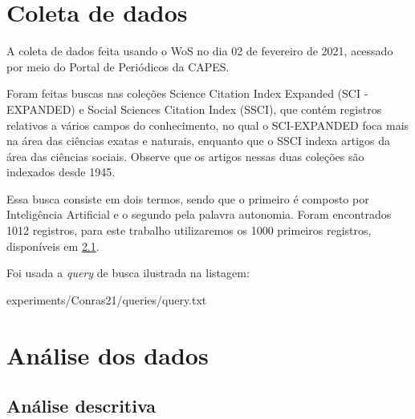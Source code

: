 \section{Coleta de dados}

A coleta de dados feita usando o WoS no dia 02 de fevereiro de 2021, acessado por meio do Portal de Periódicos da CAPES.

Foram feitas buscas nas coleções Science  Citation  Index  Expanded (SCI -EXPANDED) e Social  Sciences  Citation  Index (SSCI), que contém registros relativos a vários campos do conhecimento, no qual o SCI-EXPANDED foca mais na área das ciências exatas e naturais, enquanto que o SSCI indexa artigos da área das ciências sociais. Observe que os artigos nessas duas coleções são indexados desde 1945. 

Essa busca consiste em dois termos, sendo que o primeiro é composto por Inteligência Artificial e o segundo pela palavra autonomia. Foram encontrados 1012 registros, para este trabalho utilizaremos os 1000 primeiros registros, disponíveis em \ref{}.

Foi usada a \textit{query} de busca ilustrada na listagem:


{experiments/Conras21/queries/query.txt}


\section{Análise dos dados}

\subsection{Análise descritiva}


